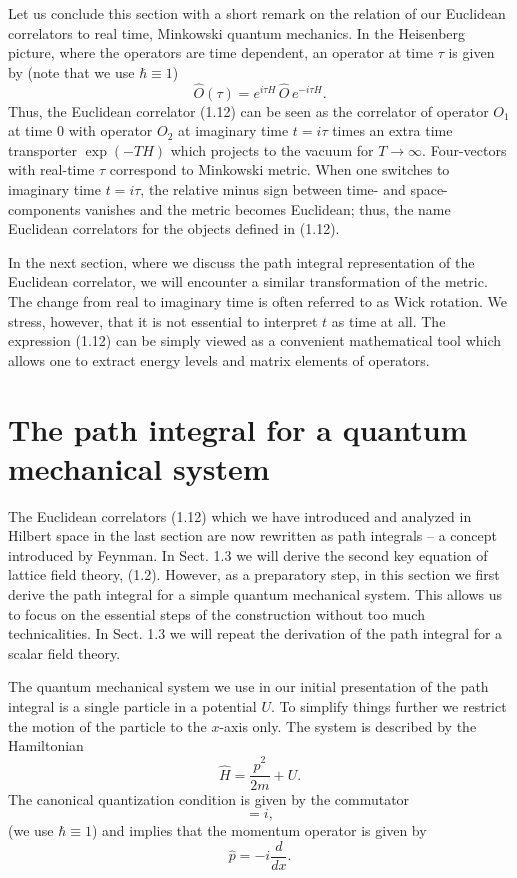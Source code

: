 Let us conclude this section with a short remark on the relation of our
Euclidean correlators to real time, Minkowski quantum mechanics. In the
Heisenberg picture, where the operators are time dependent, an operator at time
$\tau$ is given by (note that we use $\hbar \equiv 1$)
\begin{equation}
  \hat{O}(\tau) = e^{i\tau H}\,\hat{O}\,e^{-i\tau H}.
\end{equation}
Thus, the Euclidean correlator (1.12) can be seen as the correlator of operator
$O_1$ at time 0 with operator $O_2$ at imaginary time $t = i\tau$ times an
extra time transporter $\exp(-TH)$ which projects to the vacuum for
$T \to \infty$. Four-vectors with real-time $\tau$ correspond to Minkowski
metric. When one switches to imaginary time $t = i\tau$, the relative minus
sign between time- and space-components vanishes and the metric becomes
Euclidean; thus, the name Euclidean correlators for the objects defined in
(1.12).

In the next section, where we discuss the path integral representation of the
Euclidean correlator, we will encounter a similar transformation of the metric.
The change from real to imaginary time is often referred to as Wick rotation.
We stress, however, that it is not essential to interpret $t$ as time at all.
The expression (1.12) can be simply viewed as a convenient mathematical tool
which allows one to extract energy levels and matrix elements of operators.

\section{The path integral for a quantum mechanical system}

The Euclidean correlators (1.12) which we have introduced and analyzed in
Hilbert space in the last section are now rewritten as path integrals -- a
concept introduced by Feynman. In Sect. 1.3 we will derive the second key
equation of lattice field theory, (1.2). However, as a preparatory step, in
this section we first derive the path integral for a simple quantum mechanical
system. This allows us to focus on the essential steps of the construction
without too much technicalities. In Sect. 1.3 we will repeat the derivation of
the path integral for a scalar field theory.

The quantum mechanical system we use in our initial presentation of the path
integral is a single particle in a potential $U$. To simplify things further we
restrict the motion of the particle to the $x$-axis only. The system is
described by the Hamiltonian
\begin{equation}
  \hat{H} = \frac{\hat{p}^2}{2m} + U.
\end{equation}
The canonical quantization condition is given by the commutator
\begin{equation}
  [\hat{x}, \hat{p}] = i,
\end{equation}
(we use $\hbar \equiv 1$) and implies that the momentum operator is given by
\begin{equation}
  \hat{p} = -i\frac{d}{dx}.
\end{equation}

